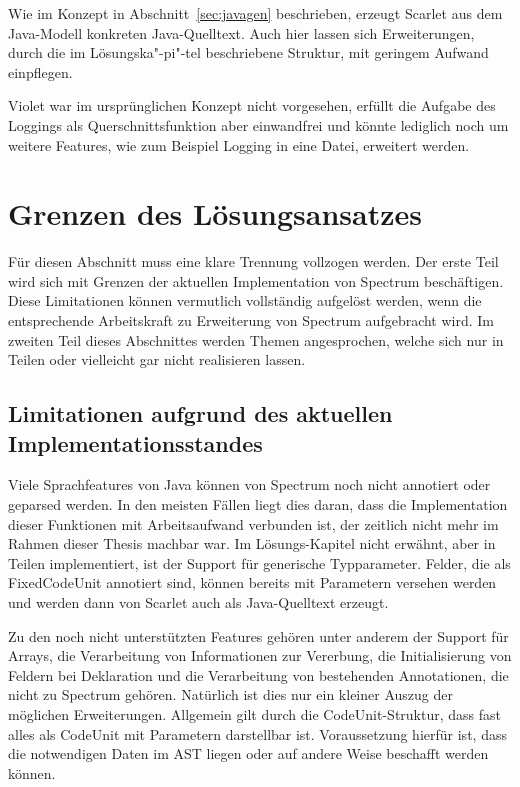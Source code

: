 \documentclass[12pt,oneside,a4paper,parskip]{scrbook}
\begin{document}
Wie im Konzept in Abschnitt~\ref{sec:javagen} beschrieben, erzeugt Scarlet aus dem Java-Modell konkreten Java-Quelltext. Auch hier lassen sich Erweiterungen, durch die im Lösungska"-pi"-tel beschriebene Struktur, mit geringem Aufwand einpflegen.

Violet war im ursprünglichen Konzept nicht vorgesehen, erfüllt die Aufgabe des Loggings als Querschnittsfunktion aber einwandfrei und könnte lediglich noch um weitere Features, wie zum Beispiel Logging in eine Datei, erweitert werden.

\section{Grenzen des Lösungsansatzes}

Für diesen Abschnitt muss eine klare Trennung vollzogen werden. Der erste Teil wird sich mit Grenzen der aktuellen Implementation von Spectrum beschäftigen. Diese Limitationen können vermutlich vollständig aufgelöst werden, wenn die entsprechende Arbeitskraft zu Erweiterung von Spectrum aufgebracht wird. Im zweiten Teil dieses Abschnittes werden Themen angesprochen, welche sich nur in Teilen oder vielleicht gar nicht realisieren lassen.

\subsection{Limitationen aufgrund des aktuellen Implementationsstandes}

Viele Sprachfeatures von Java können von Spectrum noch nicht annotiert oder geparsed werden. In den meisten Fällen liegt dies daran, dass die Implementation dieser Funktionen mit Arbeitsaufwand verbunden ist, der zeitlich nicht mehr im Rahmen dieser Thesis machbar war. Im Lösungs-Kapitel nicht erwähnt, aber in Teilen implementiert, ist der Support für generische Typparameter. Felder, die als FixedCodeUnit annotiert sind, können bereits mit Parametern versehen werden und werden dann von Scarlet auch als Java-Quelltext erzeugt.

Zu den noch nicht unterstützten Features gehören unter anderem der Support für Arrays, die Verarbeitung von Informationen zur Vererbung, die Initialisierung von Feldern bei Deklaration und die Verarbeitung von bestehenden Annotationen, die nicht zu Spectrum gehören. Natürlich ist dies nur ein kleiner Auszug der möglichen Erweiterungen. Allgemein gilt durch die CodeUnit-Struktur, dass fast alles als CodeUnit mit Parametern darstellbar ist. Voraussetzung hierfür ist, dass die notwendigen Daten im AST liegen oder auf andere Weise beschafft werden können.
\end{document}
